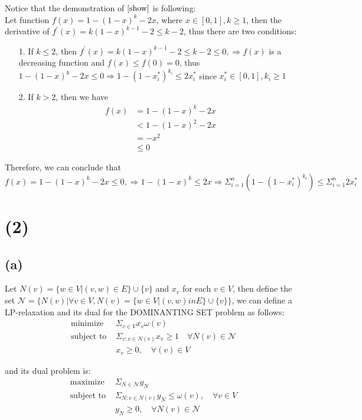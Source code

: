 \documentclass[a4paper,12pt]{article}
\def\N{{\mathcal{N}}}
\begin{document}
Notice that the demonstration of $\eqref{show}$ is following:\\
Let function $f(x)=1-(1-x)^k -2x$, where $x \in [0,1], k\geq 1$, then the derivative of $f^{\prime}(x)=k (1-x)^{k-1}-2 \leq k-2 $, thus there are two conditions:
\begin{enumerate}
\item[1. ] If $k \leq 2$, then $f^{\prime}(x)=k (1-x)^{k-1}-2 \leq k-2 \leq 0, \Rightarrow f(x) $ is a decreasing function and $f(x) \leq f(0)=0$, thus $1- (1-x)^k-2x \leq 0 \Rightarrow 1-(1-x_i^*)^{k_i} \leq 2x_i^* $ since $x^*_i \in [0,1], k_i \geq 1$\\
\item[2. ] If $k > 2$, then we have
\begin{align}
f(x) & =1-(1-x)^k -2x \\
& < 1-(1-x)^2 -2x \\
& = -x^2 \\
& \leq 0
\end{align}
\end{enumerate}
Therefore, we can conclude that $f(x)=1-(1-x)^k -2x \leq 0, \Rightarrow 1-(1-x)^k \leq 2x \Rightarrow \Sigma_{ i= 1}^n  (1- (1-x_i^*)^{k_i} )  \leq \Sigma_{ i= 1}^n 2 x_i^*$



\section*{(2) }
\subsection*{(a)}
Let $N(v)=\{w \in V| (v,w) \in E\} \cup \{v\}$ and $x_v$ for each $v \in V$, then define the set $\N=\{N(v)   | \forall v \in V, N(v) =\{w \in V| (v,w) in E\} \cup \{v\}  \}$, we can define a LP-relaxation and its dual for the DOMINANTING SET  problem as follows:  
\begin{align}
\text{minimize } & \Sigma_{ v \in V} x_v \omega(v)\\
\text{subject to } &  \Sigma_{ v: v \in N(v) } x_{v}\geq 1 \quad \forall {N(v)} \in \N \\
& x_{v} \geq 0, \quad \forall (v) \in V
\end{align}
 
and  its dual problem is:
\begin{align}
\text{maximize } & \Sigma_{N \in \N}    y_{N }\\
\text{subject to } &  \Sigma_{N : v \in N(v) } y_{N } \leq \omega(v), \quad  \forall v \in V \\
& y_{N } \geq 0, \quad  \forall {N(v)} \in \N
\end{align}
\end{document}
